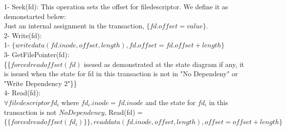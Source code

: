 \documentclass[a4paper, 11pt]{article}
\begin{document}
1- Seek(fd): This operation sets the offset for filedescriptor. We define it as demonstarted below:\\

\hspace{8mm} Just an internal assignment in the transaction, $\{{fd.offset = value}\}$.\\  


2- Write(fd):\\

\hspace{8mm} 1- $\{writedata(fd.inode, offset, length), fd.offset = fd.offset + length\}$\\

3- GetFilePointer(fd):\\

\hspace{8mm} \{\{$forcedreadoffset(fd)$ issued as demonstrated at the state diagram if any, it is issued when the state for fd in this transaction is not in "No Dependeny" or "Write Dependency 2"\}\}\\

4- Read(fd):\\

\hspace{8mm} $\forall filedescriptor fd_i$ where $fd_i.inode = fd.inode$ and the state for $fd_i$ in this transaction is not $No Dependency$, Read(fd) =$\{\{forcedreadoffset(fd_i)\}\}, {readdata(fd.inode, offset, length)}, offset = offset + length\}$\\





\end{document}

